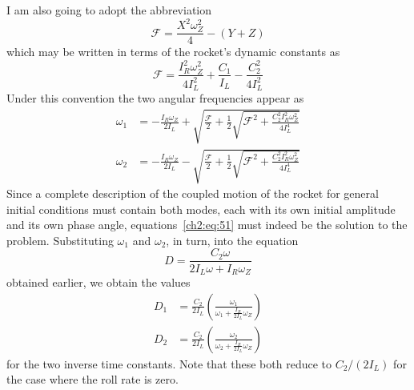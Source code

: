 I am also going to adopt the abbreviation
\begin{equation*}
\mathscr{F} = \frac{X^2\omega_Z^2}{4} - (Y + Z)
\end{equation*}
which may be written in terms of the rocket's dynamic constants as
\begin{equation}\label{ch2:eq:55}
\mathscr{F} = \frac{I_R^2\omega_Z^2}{4I_L^2} + \frac{C_1}{I_L}
  - \frac{C_2^2}{4I_L^2}
\end{equation}
Under this convention the two angular frequencies appear as
\begin{subequations}\label{ch2:eq:56}
\begin{align}
\omega_1 &= -\frac{I_R\omega_Z}{2I_L}
  + \sqrt{\frac{\mathscr{F}}{2} + \tfrac{1}{2}\sqrt{\mathscr{F}^2
    + \frac{C_2^2 I_R^2\omega_Z^2}{4I_L^4}}} \label{ch2:eq:56a}\\
\omega_2 &= -\frac{I_R\omega_Z}{2I_L}
  - \sqrt{\frac{\mathscr{F}}{2} + \tfrac{1}{2}\sqrt{\mathscr{F}^2
    + \frac{C_2^2 I_R^2\omega_Z^2}{4I_L^4}}} \label{ch2:eq:56b}
\end{align}
\end{subequations}
Since a complete description of the coupled motion of the rocket for general
initial conditions must contain both modes, each with its own initial
amplitude and its own phase angle, equations~\eqref{ch2:eq:51} must indeed be
the solution to the problem. Substituting $\omega_1$ and $\omega_2$, in turn,
into the equation
\begin{equation*}
D = \frac{C_2\omega}{2I_L\omega + I_R\omega_Z}
\end{equation*}
obtained earlier, we obtain the values
\begin{subequations}\label{ch2:eq:57}
\begin{align}
D_1 &= \frac{C_2}{2I_L}\left(\frac{\omega_1}{\omega_1
  + \frac{I_R}{2I_L}\omega_Z}\right) \label{ch2:eq:57a}\\
D_2 &= \frac{C_2}{2I_L}\left(\frac{\omega_2}{\omega_2
  + \frac{I_R}{2I_L}\omega_Z}\right) \label{ch2:eq:57b}
\end{align}
\end{subequations}
for the two inverse time constants. Note that these both reduce to
$C_2/(2I_L)$ for the case where the roll rate is zero.

